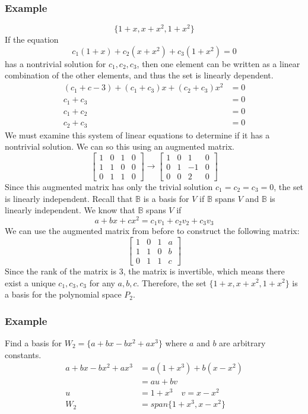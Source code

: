 \documentclass{math}
\begin{document}
\subsubsection*{Example}
\[ \{1+x,x+x^2,1+x^2\} \]
If the equation
\[ c_1(1+x)+c_2(x+x^2)+c_3(1+x^2) = 0 \]
has a nontrivial solution for \( c_1,c_2,c_3 \), then one element can be
written as a linear combination of the other elements, and thus the set is
linearly dependent.
\begin{align*}
  (c_1+c-3)+(c_1+c_3)x+(c_2+c_3)x^2 &= 0 \\
  c_1+c_3 &= 0 \\
  c_1+c_2 &= 0 \\
  c_2+c_3 &= 0
\end{align*}
We must examine this system of linear equations to determine if it has a
nontrivial solution. We can so this using an augmented matrix.
\[ \left[\begin{array}{ccc|c}
  1 & 0 & 1 & 0 \\
  1 & 1 & 0 & 0 \\
  0 & 1 & 1 & 0
\end{array}\right] \to \left[\begin{array}{ccc|c}
  1 & 0 & 1 & 0 \\
  0 & 1 & -1 & 0 \\
  0 & 0 & 2 & 0
\end{array}\right] \]
Since this augmented matrix has only the trivial solution \( c_1 = c_2 = c_3 =
0 \), the set is linearly independent. Recall that \( \mathbb{B} \) is a basis
for \( V \) if \( \mathbb{B} \) spans \( V \) and \( \mathbb{B} \) is linearly
independent. We know that \( \mathbb{B} \) spans \( V \) if
\[ a+bx+cx^2 = c_1v_1+c_2v_2+c_3v_3 \]
We can use the augmented matrix from before to construct the following matrix:
\[ \left[\begin{array}{ccc|c}
  1 & 0 & 1 & a \\
  1 & 1 & 0 & b \\
  0 & 1 & 1 & c
\end{array}\right] \]
Since the rank of the matrix is 3, the matrix is invertible, which means there
exist a unique \( c_1,c_3,c_3 \) for any \( a,b,c \). Therefore, the set
\( \{1+x,x+x^2,1+x^2\} \) is a basis for the polynomial space \( P_2 \).

\subsubsection*{Example}
Find a basis for \( W_2 = \{a+bx-bx^2+ax^3\} \) where \( a \) and \( b \) are
arbitrary constants.
\begin{align*}
  a+bx-bx^2+ax^3 &= a(1+x^3)+b(x-x^2) \\
  &= au+bv \\
  u &= 1+x^3 \quad v = x-x^2 \\
  W_2 &= span\{1+x^3,x-x^2\}
\end{align*}
\end{document}
